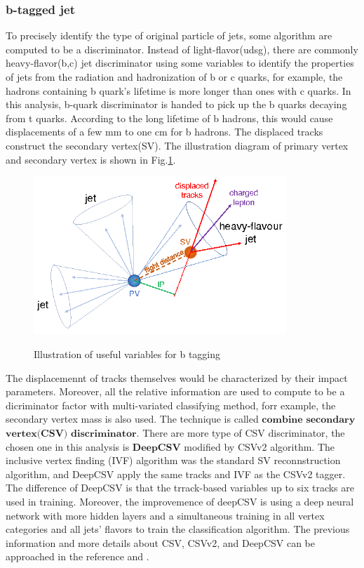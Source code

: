 		\subsubsection{b-tagged jet}
		\label{sssec:bjet}

			To precisely identify the type of original particle of jets, some algorithm are computed to be a discriminator. Instead of light-flavor(udsg), there are commonly heavy-flavor(b,c) jet discriminator using some variables to identify the properties of jets from the radiation and hadronization of b or c quarks, for example, the hadrons containing b quark's lifetime is more longer than ones with c quarks. In this analysis, b-quark discriminator is handed to pick up the b quarks decaying from t quarks. According to the long lifetime of b hadrons, this would cause displacements of a few mm to one cm for b hadrons. The displaced tracks construct the secondary vertex(SV). The illustration diagram of primary vertex and secondary vertex is shown in Fig.\ref{PhysObj:fig:PV_SV}. 

			\begin{figure}[H]
			\centering{}
		    	\includegraphics[width=0.85\textwidth]{Figures/PhysObj/PV_SV.png}\\
			\caption{Illustration of useful variables for b tagging \cite{CMS-BTV-16-002}}
			\label{PhysObj:fig:PV_SV}
			\end{figure}
			\FloatBarrier

			The displacemennt of tracks themselves would be characterized by their impact parameters. Moreover, all the relative information are used to compute to be a dicriminator factor with multi-variated classifying method, forr example, the secondary vertex mass is also used. The technique is called $\textbf{combine}$ $\textbf{secondary}$ $\textbf{vertex}$$\textbf{(CSV)}$ $\textbf{discriminator}$. There are more type of CSV discriminator, the chosen one in this analysis is $\textbf{DeepCSV}$ modified by CSVv2 algorithm. The inclusive vertex finding (IVF) algorithm was the standard SV reconnstruction algorithm, and DeepCSV apply the same tracks and IVF as the CSVv2 tagger. The difference of DeepCSV is that the trrack-based variables up to six tracks are used in training. Moreover, the improvemence of deepCSV is using a deep neural network with more hidden layers and a simultaneous training in all vertex categories and all jets' flavors to train the classification algorithm. The previous information and more details about CSV, CSVv2, and DeepCSV can be approached in the reference \cite{CMS-PAS-BTV-15-001} and \cite{CMS-BTV-16-002}.

